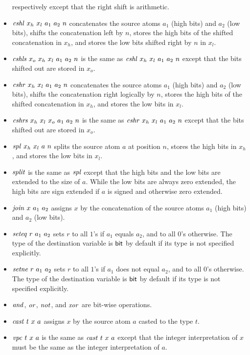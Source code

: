 \documentclass{article}
\begin{document}
\begin{itemize}
  respectively except that the right shift is arithmetic.
\item $\mathit{cshl}\ x_h\ x_l\ a_1\ a_2\ n$ concatenates the source atoms
  $a_1$ (high bits) and $a_2$ (low bits), shifts the concatenation
  left by $n$, stores the high bits of the shifted concatenation in
  $x_h$, and stores the low bits shifted right by $n$ in $x_l$.
\item $\icshls\ x_o\ x_h\ x_l\ a_1\ a_2\ n$ is the same as $\mathit{cshl}\
  x_h\ x_l\ a_1\ a_2\ n$ except that the bits shifted out are stored
  in $x_o$.
\item $\mathit{cshr}\ x_h\ x_l\ a_1\ a_2\ n$ concatenates the source atoms
  $a_1$ (high bits) and $a_2$ (low bits), shifts the concatenation
  right logically by $n$, stores the high bits of the shifted
  concatenation in $x_h$, and stores the low bits in $x_l$.
\item $\icshrs\ x_h\ x_l\ x_o\ a_1\ a_2\ n$ is the same as $\mathit{cshr}\
  x_h\ x_l\ a_1\ a_2\ n$ except that the bits shifted out are stored
  in $x_o$.
\item $\mathit{spl}\ x_h\ x_l\ a\ n$ splits the source atom $a$ at position
  $n$, stores the high bits in $x_h$, and stores the low bits in
  $x_l$.
\item $\mathit{split}$ is the same as $\mathit{spl}$ except that the high bits and
  the low bits are extended to the size of $a$.
  While the low bits are always zero extended, the high bits are sign
  extended if $a$ is signed and otherwise zero extended.
\item $\mathit{join}\ x\ a_1\ a_2$ assigns $x$ by the concatenation of the
  source atoms $a_1$ (high bits) and $a_2$ (low bits).
\item $\mathit{seteq}\ r\ a_1\ a_2$ sets $r$ to all $1$'s if $a_1$ equals
  $a_2$, and to all $0$'s otherwise.
  The type of the destination variable is $\mathsf{bit}$ by default if its
  type is not specified explicitly.
\item $\mathit{setne}\ r\ a_1\ a_2$ sets $r$ to all $1$'s if $a_1$ does not
  equal $a_2$, and to all $0$'s otherwise.
  The type of the destination variable is $\mathsf{bit}$ by default if its
  type is not specified explicitly.
\item $\mathit{and}$, $\mathit{or}$, $\mathit{not}$, and $\mathit{xor}$ are bit-wise operations.
\item $\mathit{cast}\ t\ x\ a$ assigns $x$ by the source atom $a$ casted to the
  type $t$.
\item $\mathit{vpc}\ t\ x\ a$ is the same as $\mathit{cast}\ t\ x\ a$ except that
  the integer interpretation of $x$ must be the same as the integer
  interpretation of $a$.

\end{itemize}
\end{document}
